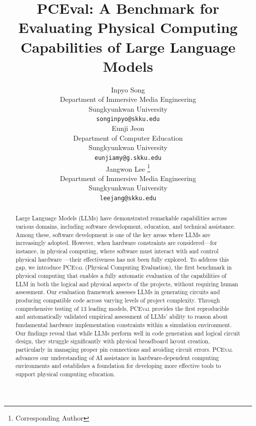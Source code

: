 \documentclass{article} %
\title{PCEval: A Benchmark for Evaluating Physical Computing Capabilities of Large Language Models}
\author{Inpyo Song \\
Department of Immersive Media Engineering\\
Sungkyunkwan University\\
\texttt{songinpyo@skku.edu} \\
\And
Eunji Jeon  \\
Department of Computer Education \\
Sungkyunkwan University \\
\texttt{eunjiamy@g.skku.edu} \\
\AND
Jangwon Lee 
\thanks{Corresponding Author} \\
Department of Immersive Media Engineering \\
Sungkyunkwan University\\
\texttt{leejang@skku.edu}
}
\begin{document}
\maketitle

\begin{abstract}
Large Language Models (LLMs) have demonstrated remarkable capabilities across various domains,
including software development, education, and technical assistance.
Among these, software development is one of the key areas where LLMs are increasingly adopted.
However, when hardware constraints are considered—for instance, in physical computing,
where software must interact with and control physical hardware —their effectiveness has not been fully explored.
To address this gap, we introduce \textsc{PCEval} (Physical Computing Evaluation),
the first benchmark in physical computing that enables a fully automatic evaluation of the capabilities of LLM in both the logical and physical aspects of the projects, without requiring human assessment.
Our evaluation framework assesses LLMs in generating circuits and producing compatible code across varying levels of project complexity.
Through comprehensive testing of 13 leading models, \textsc{PCEval} provides the first reproducible and automatically validated empirical assessment of LLMs' ability to reason about fundamental hardware implementation constraints within a simulation environment.
Our findings reveal that while LLMs perform well in code generation and logical circuit design, they struggle significantly with physical breadboard layout creation, particularly in managing proper pin connections and avoiding circuit errors.
\textsc{PCEval} advances our understanding of AI assistance in hardware-dependent computing environments and establishes a foundation for developing more effective tools to support physical computing education.
\end{abstract}
\end{document}

